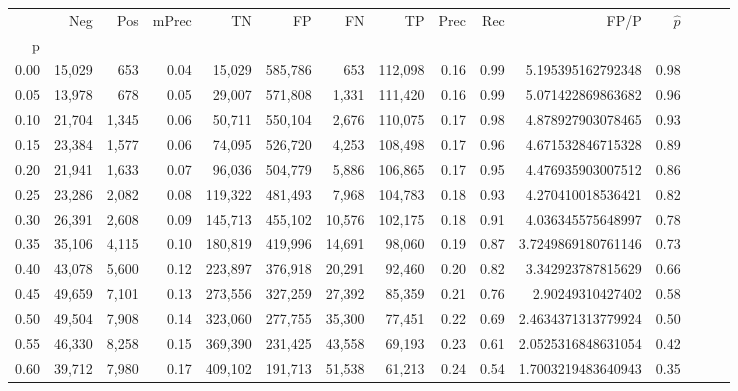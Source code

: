 \begin{tabular}{rrrrrrrrrrrrrrr}
\toprule
{} &     Neg &    Pos & mPrec &       TN &       FP &       FN &       TP &  Prec &   Rec &                 FP/P & $\hat{p}$ \\
p    &         &        &       &          &          &          &          &       &       &                      &           \\
\midrule
0.00 &  15,029 &    653 &  0.04 &   15,029 &  585,786 &      653 &  112,098 &  0.16 &  0.99 &    5.195395162792348 &      0.98 \\
0.05 &  13,978 &    678 &  0.05 &   29,007 &  571,808 &    1,331 &  111,420 &  0.16 &  0.99 &    5.071422869863682 &      0.96 \\
0.10 &  21,704 &  1,345 &  0.06 &   50,711 &  550,104 &    2,676 &  110,075 &  0.17 &  0.98 &    4.878927903078465 &      0.93 \\
0.15 &  23,384 &  1,577 &  0.06 &   74,095 &  526,720 &    4,253 &  108,498 &  0.17 &  0.96 &    4.671532846715328 &      0.89 \\
0.20 &  21,941 &  1,633 &  0.07 &   96,036 &  504,779 &    5,886 &  106,865 &  0.17 &  0.95 &    4.476935903007512 &      0.86 \\
0.25 &  23,286 &  2,082 &  0.08 &  119,322 &  481,493 &    7,968 &  104,783 &  0.18 &  0.93 &    4.270410018536421 &      0.82 \\
0.30 &  26,391 &  2,608 &  0.09 &  145,713 &  455,102 &   10,576 &  102,175 &  0.18 &  0.91 &    4.036345575648997 &      0.78 \\
0.35 &  35,106 &  4,115 &  0.10 &  180,819 &  419,996 &   14,691 &   98,060 &  0.19 &  0.87 &   3.7249869180761146 &      0.73 \\
0.40 &  43,078 &  5,600 &  0.12 &  223,897 &  376,918 &   20,291 &   92,460 &  0.20 &  0.82 &    3.342923787815629 &      0.66 \\
0.45 &  49,659 &  7,101 &  0.13 &  273,556 &  327,259 &   27,392 &   85,359 &  0.21 &  0.76 &     2.90249310427402 &      0.58 \\
0.50 &  49,504 &  7,908 &  0.14 &  323,060 &  277,755 &   35,300 &   77,451 &  0.22 &  0.69 &   2.4634371313779924 &      0.50 \\
0.55 &  46,330 &  8,258 &  0.15 &  369,390 &  231,425 &   43,558 &   69,193 &  0.23 &  0.61 &   2.0525316848631054 &      0.42 \\
0.60 &  39,712 &  7,980 &  0.17 &  409,102 &  191,713 &   51,538 &   61,213 &  0.24 &  0.54 &   1.7003219483640943 &      0.35 \\

\end{tabular}
